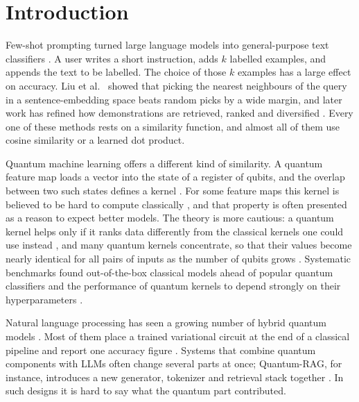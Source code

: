 \title{\PaperTitle}

\makefront

\section{Introduction}

Few-shot prompting turned large language models into general-purpose text classifiers
\cite{brown2020language}. A user writes a short instruction, adds $k$ labelled examples, and appends
the text to be labelled. The choice of those $k$ examples has a large effect on accuracy. Liu et
al.~\cite{liu2022makes} showed that picking the nearest neighbours of the query in a sentence-embedding
space beats random picks by a wide margin, and later work has refined how demonstrations are
retrieved, ranked and diversified \cite{rubin2022learning,levy2023diverse,ye2023compositional}.
Every one of these methods rests on a similarity function, and almost all of them use cosine similarity
or a learned dot product.

Quantum machine learning offers a different kind of similarity. A quantum feature map loads a vector
into the state of a register of qubits, and the overlap between two such states defines a kernel
\cite{havlicek2019supervised,schuld2019feature}. For some feature maps this kernel is believed to be hard
to compute classically \cite{havlicek2019supervised,liu2021rigorous}, and that property is often presented as
a reason to expect better models. The theory is more cautious: a quantum kernel helps only if it ranks
data differently from the classical kernels one could use instead \cite{huang2021power}, and many quantum
kernels concentrate, so that their values become nearly identical for all pairs of inputs as the
number of qubits grows \cite{thanasilp2024exponential,shaydulin2022importance}. Systematic benchmarks
found out-of-the-box classical models ahead of popular quantum classifiers \cite{bowles2024better} and
the performance of quantum kernels to depend strongly on their hyperparameters \cite{schnabel2025scrutiny}.

Natural language processing has seen a growing number of hybrid quantum models
\cite{lorenz2023qnlp,meichanetzidis2023grammar,vats2025survey}. Most of them place a trained variational
circuit at the end of a classical pipeline and report one accuracy figure
\cite{pal2025hybrid,devanarayanan2025paraphrase,hassan2026hybrid}. Systems that combine quantum
components with LLMs often change several parts at once; Quantum-RAG, for instance, introduces a new
generator, tokenizer and retrieval stack together \cite{singh2025quantumrag}. In such designs it is hard to
say what the quantum part contributed.


